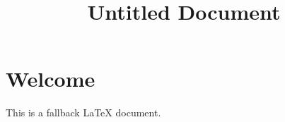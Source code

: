 \documentclass[11pt]{article}
\title{Untitled Document}
\begin{document}
\maketitle


\section*{Welcome}
This is a fallback LaTeX document.
\end{document}
